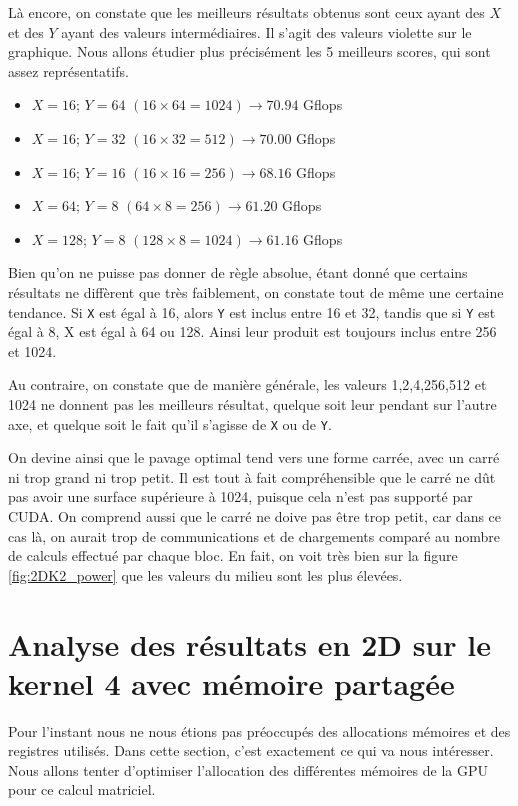 \documentclass[	DIV=calc,%
							paper=a4,%
							fontsize=11pt%
							]{scrartcl}	 					%
\begin{document}
Là encore, on constate que les meilleurs résultats obtenus sont ceux ayant des $ X $ et des $ Y $ ayant des valeurs intermédiaires. Il s'agit des valeurs violette sur le graphique. Nous allons étudier plus précisément les 5 meilleurs scores, qui sont assez représentatifs.\newpage
\begin{itemize}
\item $X = 16$; $Y = 64$ $( 16 \times 64 = 1024 ) \rightarrow 70.94$ Gflops 
\item $X = 16$; $Y = 32$ $( 16 \times 32 = 512 ) \rightarrow 70.00$ Gflops 
\item $X = 16$; $Y = 16$ $( 16 \times 16 = 256 ) \rightarrow 68.16$ Gflops 
\item $X = 64$; $Y = 8$ $( 64 \times 8 = 256 ) \rightarrow 61.20$ Gflops 
\item $X = 128$; $Y = 8$ $( 128 \times 8 = 1024 ) \rightarrow 61.16$ Gflops 
\end{itemize}

Bien qu'on ne puisse pas donner de règle absolue, étant donné que certains résultats ne diffèrent que très faiblement, on constate tout de même une certaine tendance. Si \texttt{X} est égal à 16, alors \texttt{Y} est inclus entre 16 et 32, tandis que si \texttt{Y} est égal à 8, X est égal à 64 ou 128. Ainsi leur produit est toujours inclus entre 256 et 1024.\par
Au contraire, on constate que de manière générale, les valeurs 1,2,4,256,512 et 1024 ne donnent pas les meilleurs résultat, quelque soit leur pendant sur l'autre axe, et quelque soit le fait qu'il s'agisse de \texttt{X} ou de \texttt{Y}.\par
On devine ainsi que le pavage optimal tend vers une forme carrée, avec un carré ni trop grand ni trop petit. Il est tout à fait compréhensible que le carré ne dût pas avoir une surface supérieure à 1024, puisque cela n'est pas supporté par CUDA. On comprend aussi que le carré ne doive pas être trop petit, car dans ce cas là, on aurait trop de communications et de chargements comparé au nombre de calculs effectué par chaque bloc. En fait, on voit très bien sur la figure \ref{fig:2DK2_power} que les valeurs du milieu sont les plus élevées.

\section{Analyse des résultats en 2D sur le kernel 4 avec mémoire partagée}
Pour l'instant nous ne nous étions pas préoccupés des allocations mémoires et des registres utilisés. Dans cette section, c'est exactement ce qui va nous intéresser. Nous allons tenter d'optimiser l'allocation des différentes mémoires de la GPU pour ce calcul matriciel.
\end{document}
